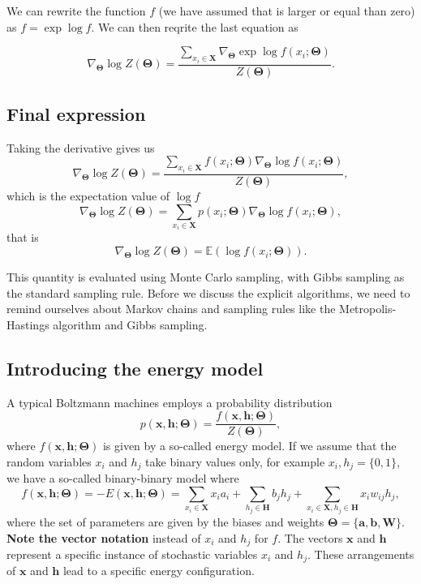 \documentclass[%
oneside,                 %
final,                   %
10pt]{article}
\begin{document}
We can rewrite the function $f$ (we have assumed that is larger or
equal than zero) as $f=\exp{\log{f}}$. We can then reqrite the last
equation as

\[
\nabla_{\bm{\Theta}}\log{Z(\bm{\Theta})}=\frac{ \sum_{x_i\in \bm{X}} \nabla_{\bm{\Theta}}\exp{\log{f(x_i;\bm{\Theta})}}   }{Z(\bm{\Theta})}.
\]

\subsection*{Final expression}

Taking the derivative gives us
\[
\nabla_{\bm{\Theta}}\log{Z(\bm{\Theta})}=\frac{ \sum_{x_i\in \bm{X}}f(x_i;\bm{\Theta}) \nabla_{\bm{\Theta}}\log{f(x_i;\bm{\Theta})}   }{Z(\bm{\Theta})}, 
\]
which is the expectation value of $\log{f}$
\[
\nabla_{\bm{\Theta}}\log{Z(\bm{\Theta})}=\sum_{x_i\in \bm{X}}p(x_i;\bm{\Theta}) \nabla_{\bm{\Theta}}\log{f(x_i;\bm{\Theta})},
\]
that is
\[
\nabla_{\bm{\Theta}}\log{Z(\bm{\Theta})}=\mathbb{E}(\log{f(x_i;\bm{\Theta})}).
\]

This quantity is evaluated using Monte Carlo sampling, with Gibbs
sampling as the standard sampling rule.  Before we discuss the
explicit algorithms, we need to remind ourselves about Markov chains
and sampling rules like the Metropolis-Hastings algorithm and Gibbs
sampling.

\subsection*{Introducing the energy model}

A typical Boltzmann machines employs a probability distribution
\[
p(\bm{x},\bm{h};\bm{\Theta}) = \frac{f(\bm{x},\bm{h};\bm{\Theta})}{Z(\bm{\Theta})},
\]
where $f(\bm{x},\bm{h};\bm{\Theta})$ is given by a so-called energy model. If we assume that the random variables $x_i$ and $h_j$ take binary values only, for example $x_i,h_j=\{0,1\}$, we have a so-called binary-binary model where
\[
f(\bm{x},\bm{h};\bm{\Theta})=-E(\bm{x}, \bm{h};\bm{\Theta}) = \sum_{x_i\in \bm{X}} x_i a_i+\sum_{h_j\in \bm{H}} b_j h_j + \sum_{x_i\in \bm{X},h_j\in\bm{H}} x_i w_{ij} h_j,
\]
where the set of parameters are given by the biases and weights $\bm{\Theta}=\{\bm{a},\bm{b},\bm{W}\}$.
\textbf{Note the vector notation} instead of $x_i$ and $h_j$ for $f$. The vectors $\bm{x}$ and $\bm{h}$ represent a specific instance of stochastic variables $x_i$ and $h_j$. These arrangements of $\bm{x}$ and $\bm{h}$ lead to a specific energy configuration.
\end{document}
